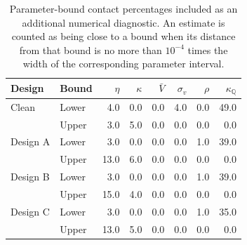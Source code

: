 \begin{table}[H]
\centering
\small
\begin{tabular}{llrrrrrr}
\toprule
Design & Bound & $\eta$ & $\kappa$ & $\bar V$ & $\sigma_v$ & $\rho$ & $\kappa_{\mathbb Q}$ \\
\midrule
Clean & Lower & 4.0 & 0.0 & 0.0 & 4.0 & 0.0 & 49.0 \\
 & Upper & 3.0 & 5.0 & 0.0 & 0.0 & 0.0 & 0.0 \\
\addlinespace
Design A & Lower & 3.0 & 0.0 & 0.0 & 0.0 & 1.0 & 39.0 \\
 & Upper & 13.0 & 6.0 & 0.0 & 0.0 & 0.0 & 0.0 \\
\addlinespace
Design B & Lower & 3.0 & 0.0 & 0.0 & 0.0 & 1.0 & 39.0 \\
 & Upper & 15.0 & 4.0 & 0.0 & 0.0 & 0.0 & 0.0 \\
\addlinespace
Design C & Lower & 3.0 & 0.0 & 0.0 & 0.0 & 1.0 & 35.0 \\
 & Upper & 13.0 & 5.0 & 0.0 & 0.0 & 0.0 & 0.0 \\
\bottomrule
\end{tabular}
\caption{Parameter-bound contact percentages included as an additional numerical diagnostic. An estimate is counted as being close to a bound when its distance from that bound is no more than $10^{-4}$ times the width of the corresponding parameter interval.}
\label{tab:mc_bound_contacts}
\end{table}
